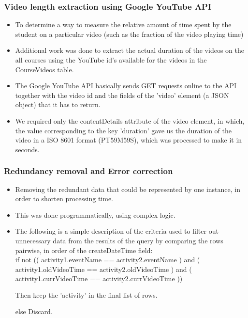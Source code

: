 \documentclass[12pt,xcolor=dvipsnames]{beamer}
\begin{document}
\begin{frame}[t]
\frametitle{Video length extraction using Google YouTube API}

\begin{itemize}
\item To determine a way to measure the relative amount of time spent by the student on a particular video (such as the fraction of the video playing time)

\item Additional work was done to extract the actual duration of the videos on the all courses using the YouTube id's available for the videos in the CourseVideos table.

\item The Google YouTube API basically sends GET requests online to the API together with the video id and the fields of the 'video' element (a JSON object) that it has to return.

\item We required only the contentDetails attribute of the video element, in which, the value corresponding to the key 'duration' gave us the duration of the video in a ISO 8601 format (PT59M59S), which was processed to make it in seconds.

\end{itemize}

\end{frame}

\begin{frame}[t]
\frametitle{Redundancy removal and Error correction}

\begin{itemize}
\item Removing the redundant data that could be represented by one instance, in order to shorten processing time.
\item This was done programmatically, using complex logic.
\item The following is a simple description of the criteria used to filter out unnecessary data from the results of the query by comparing the rows pairwise, in order of the createDateTime field:\\



if not (( activity1.eventName == activity2.eventName ) and 	( activity1.oldVideoTime == activity2.oldVideoTime ) and 	( activity1.currVideoTime == activity2.currVideoTime ))

		Then keep the 'activity' in the final list of rows.

else Discard.


\end{itemize}

\end{frame}
\end{document}
